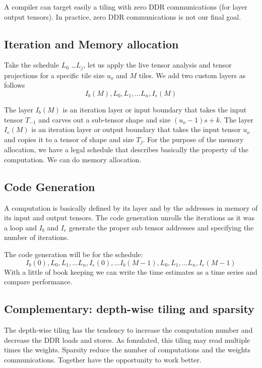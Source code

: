 \documentclass[conference]{IEEEtran}
\begin{document}
A compiler can target easily a tiling with zero DDR communications
(for layer output tensors). In practice, zero DDR communications is
not our final goal.

\subsection{Iteration and Memory allocation}
Take the schedule $L_{0}$ \dots $L_{j}$, let us apply the live tensor
analysis and tensor projections for a specific tile size $u_{o}$ and $M$
tiles. We add two custom layers as follows
\[ I_{b}(M), L_{0}, L_{1}, ... L_{n}, I_{e}(M) \]

The layer $I_{b}(M)$ is an iteration layer or input boundary that takes
the input tensor $T_{-1}$ and carves out a sub-tensor shape and size
$(u_{o}-1)s+k$. The layer $I_{e}(M)$ is an iteration layer or output
boundary that takes the input tensor $u_{o}$ and copies it to a tensor
of shape and size $T_{j}$. For the purpose of the memory allocation, we
have a legal schedule that describes basically the property of the
computation.  We can do memory allocation.

\subsection{Code Generation}
A computation is basically defined by its layer and by the addresses
in memory of its input and output tensors. The code generation unrolls
the iterations as it was a loop and $I_{b}$ and $I_{e}$ generate the
proper sub tensor addresses and specifying the number of iterations.

The code generation will be for the schedule:
\[ I_{b}(0), L_{0}, L_{1}, ... L_{n}, I_{e}(0), 
\dots I_{b}(M-1), L_{0}, L_{1}, ... L_{n}, I_{e}(M-1) \]
With a little of book keeping we can write the time estimates as a
time series and compare performance.

\subsection{Complementary: depth-wise tiling and sparsity}
The depth-wise tiling has the tendency to increase the computation
number and decrease the DDR loads and stores. As fomulated, this
tiling may read multiple times the weights. Sparsity reduce the number
of computations and the weights communications. Together have the
opportunity to work better.
\end{document}
